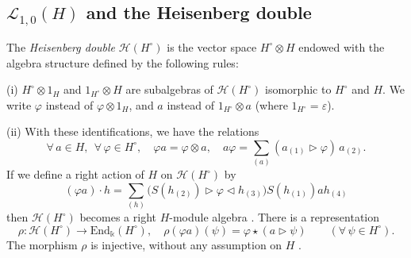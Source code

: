 \documentclass[11pt]{amsart}
\begin{document}
\subsection{\texorpdfstring{$\mathcal{L}_{1,0}(H)$}{The handle algebra} and the Heisenberg double}\label{subsecHeisenbergL10}
\indent The {\em Heisenberg double} $\mathcal{H}(H^\circ)$ is the vector space $H^\circ \otimes H$ endowed with the algebra structure defined by the following rules:

\indent (i) $H^\circ \otimes 1_H$ and $1_{H^\circ} \otimes H$ are subalgebras of $\mathcal{H}(H^{\circ})$ isomorphic to $H^\circ$ and $H$. We write $\varphi$ instead of $\varphi \otimes 1_H$, and $a$ instead of $1_{H^\circ} \otimes a$ (where $1_{H^\circ} = \varepsilon$).

\indent (ii) With these identifications, we have the relations 
\begin{equation}\label{productHeisenberg}
\forall \, a \in H, \:\: \forall \, \varphi \in H^\circ, \quad \varphi a = \varphi \otimes a, \quad a\varphi = \sum_{(a)}(a_{(1)} \rhd \varphi) \, a_{(2)}.
\end{equation}
If we define a right action of $H$ on $\mathcal{H}(H^\circ)$ by
\begin{equation}\label{modAlgStructHeisenberg}
(\varphi a) \cdot h = \sum_{(h)} \bigl( S(h_{(2)}) \rhd \varphi \lhd h_{(3)} \bigr) S(h_{(1)})ah_{(4)}
\end{equation}
then $\mathcal{H}(H^\circ)$ becomes a right $H$-module algebra \cite[\S 3.3]{BFR}.  There is a representation
\begin{equation}\label{HeisenbergRep}
\rho : \mathcal{H}(H^\circ) \to \mathrm{End}_\Bbbk(H^\circ), \quad \rho(\varphi a)(\psi) = \varphi \star (a \rhd \psi) \qquad (\forall \, \psi \in H^\circ).
\end{equation}
The morphism $\rho$ is injective, without any assumption on $H$ \cite[Lem.\,9.4.2]{Mo}.

\smallskip
\end{document}
